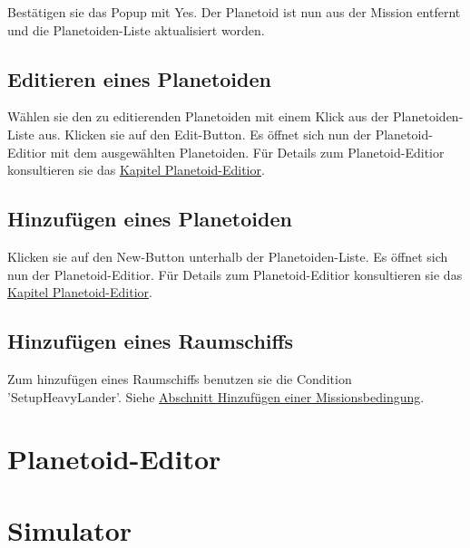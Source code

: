 Bestätigen sie das Popup mit Yes.
Der Planetoid ist nun aus der Mission entfernt und die Planetoiden-Liste aktualisiert worden.

\subsection{Editieren eines Planetoiden}
Wählen sie den zu editierenden Planetoiden mit einem Klick aus der Planetoiden-Liste aus.
Klicken sie auf den Edit-Button.
Es öffnet sich nun der Planetoid-Editior mit dem ausgewählten Planetoiden.
Für Details zum Planetoid-Editior konsultieren sie das \hyperlink{planetoideditor}{Kapitel Planetoid-Editior}.

\subsection{Hinzufügen eines Planetoiden}
\unimplemented
Klicken sie auf den New-Button unterhalb der Planetoiden-Liste.
Es öffnet sich nun der Planetoid-Editior.
Für Details zum Planetoid-Editior konsultieren sie das \hyperlink{planetoideditor}{Kapitel Planetoid-Editior}.

\subsection{Hinzufügen eines Raumschiffs}
Zum hinzufügen eines Raumschiffs benutzen sie die Condition 'SetupHeavyLander'.
Siehe \hyperlink{addcondition}{Abschnitt Hinzufügen einer Missionsbedingung}.

\hypertarget{planetoideditor}{\section{Planetoid-Editor}}

\hypertarget{simulator}{\section{Simulator}}